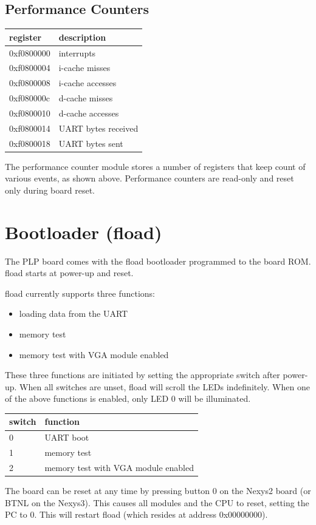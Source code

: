 \documentclass{article}
\begin{document}
\subsection{Performance Counters}
\begin{tabular}{ | l | l | }
\hline
register & description \\
\hline 
0xf0800000 & interrupts \\
0xf0800004 & i-cache misses \\
0xf0800008 & i-cache accesses \\
0xf080000c & d-cache misses \\
0xf0800010 & d-cache accesses \\
0xf0800014 & UART bytes received \\
0xf0800018 & UART bytes sent \\
\hline
\end{tabular}

The performance counter module stores a number of registers that keep count of various events, as shown above. Performance counters are read-only and reset only during board reset. 
\section{Bootloader (fload)}
The PLP board comes with the fload bootloader programmed to the board ROM. fload starts at power-up and reset.

fload currently supports three functions:
\begin{itemize}
\item loading data from the UART
\item memory test
\item memory test with VGA module enabled 
\end{itemize}
These three functions are initiated by setting the appropriate switch after power-up. When all switches are unset, fload will scroll the LEDs indefinitely. When one of the above functions is enabled, only LED 0 will be illuminated.
 
\begin{tabular}{ | l | l | }
\hline
switch & function \\
\hline
0 & UART boot \\
1 & memory test \\
2 & memory test with VGA module enabled \\
\hline
\end{tabular}

The board can be reset at any time by pressing button 0 on the Nexys2 board (or BTNL on the Nexys3). This causes all modules and the CPU to reset, setting the PC to 0. This will restart fload (which resides at address 0x00000000). 
\end{document}
